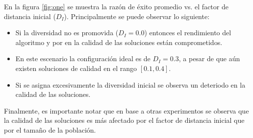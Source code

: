 En la figura \ref{fig:one} se muestra la razón de éxito promedio vs. el factor de distancia inicial ($D_I$).
%
Principalmente se puede observar lo siguiente:
\begin{itemize}
\item Si la diversidad no es promovida ($D_I=0.0$) entonces el rendimiento del algoritmo y por en la calidad de las soluciones están comprometidos.
\item En este escenario la configuración ideal es de $D_I=0.3$, a pesar de que aún existen soluciones de calidad en el rango $[0.1, 0.4]$.
\item Si se asigna excesivamente la diversidad inicial se observa un deteriodo en la calidad de las soluciones.
\end{itemize}
Finalmente, es importante notar que en base a otras experimentos se observa que la calidad de las soluciones es más afectado por el factor de distancia inicial que por el tamaño de la población.
%
%

